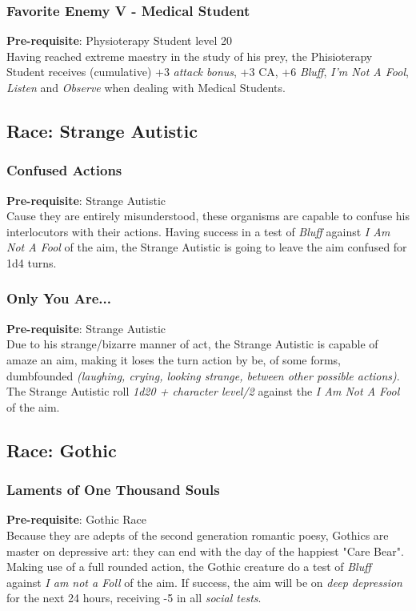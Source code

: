 \documentclass[ letterpaper,12pt]{article}
\begin{document}
\subsubsection{Favorite Enemy V - Medical Student}
 {\bf Pre-requisite}: Physioterapy Student level 20\\
 Having reached extreme maestry in the study of his prey, the Phisioterapy Student receives (cumulative) +3 {\it attack bonus}, +3 CA, +6 {\it Bluff}, {\it I'm Not A Fool}, {\it Listen} and {\it Observe} when dealing with Medical Students.

\subsection{Race: Strange Autistic}

\subsubsection{Confused Actions}
{\bf Pre-requisite}: Strange Autistic\\
Cause they are entirely misunderstood, these organisms are capable to confuse his interlocutors with their actions. Having success in a test of {\it Bluff} against {\it I Am Not A Fool} of the aim, the Strange Autistic is going to leave the aim confused for 1d4 turns.

\subsubsection{Only You Are...}
 {\bf Pre-requisite}: Strange Autistic\\
Due to his strange/bizarre manner of act, the Strange Autistic is capable of amaze an aim, making it loses the turn action by be, of some forms, dumbfounded {\it (laughing, crying, looking strange, between other possible actions)}.  The Strange Autistic roll {\it 1d20 + character level/2} against the {\it I Am Not A Fool} of the aim.

\subsection{Race: Gothic}

\subsubsection{Laments of One Thousand Souls}
{\bf Pre-requisite}: Gothic Race\\
Because they are adepts of the second generation romantic poesy, Gothics are master on depressive art: they can end with the day of the happiest "Care Bear". Making use of a full rounded action, the Gothic creature do a test of {\it Bluff} against {\it I am not a Foll} of the aim. If success, the aim will be on {\it deep depression} for the next 24 hours, receiving -5 in all {\it social tests}.
\end{document}

